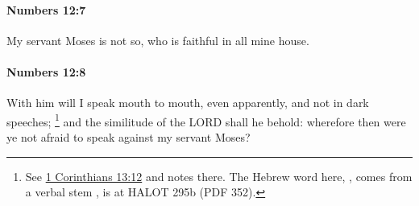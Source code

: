 		\paragraph{Numbers 12:7} %
			\label{NUMBERS-12-7}

			My servant Moses is not so, who is faithful in all mine house.


		\paragraph{Numbers 12:8} %
			\label{NUMBERS-12-8}

			With him will I speak mouth to mouth, even apparently, and not in dark speeches;%
				\footnote{%
					See \hyperref[1CORINTHIANS-13-12]{1 Corinthians 13:12} and notes there. The Hebrew word here, , comes from a verbal stem , is at HALOT 295b (PDF 352).
					}
			and the similitude of the LORD shall he behold: wherefore then were ye not afraid to speak against my servant Moses?

